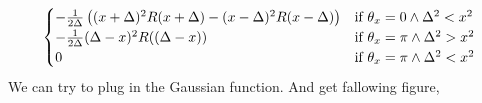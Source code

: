 \documentclass[a4paper,12pt]{article}
\begin{document}
\begin{align}
\begin{cases}
                           - \frac{1}{2\Delta} \left((x + \Delta)^2 R(x + \Delta) - (x - \Delta)^2 R(x - \Delta)\right) & \text{if } \theta_x = 0 \wedge \Delta^2 < x^2 \\
                           - \frac{1}{2\Delta} (\Delta - x)^2 R((\Delta - x)) & \text{if } \theta_x = \pi \wedge \Delta^2 > x^2 \\
                           0 & \text{if } \theta_x = \pi \wedge \Delta^2 < x^2 \\
                       \end{cases} \notag \\
\end{align}
We can try to plug in the Gaussian function. And get fallowing figure,
\appendix

\acknowledgments






\end{document}
